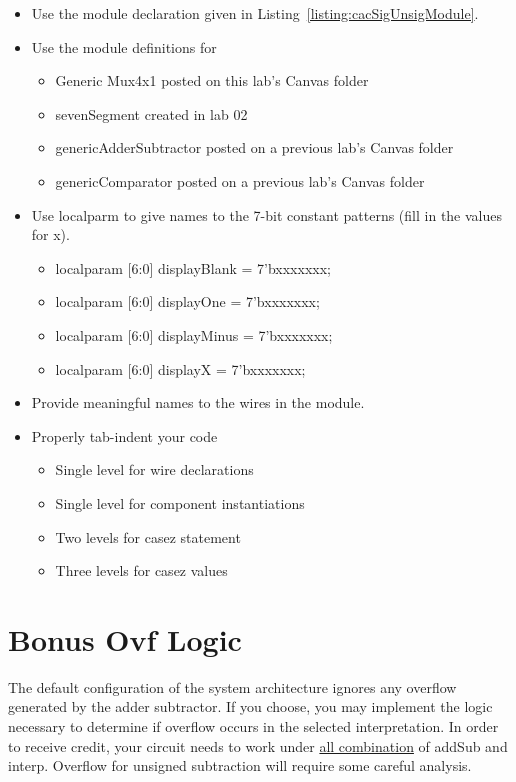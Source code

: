 \begin{itemize}
\item
  Use the module declaration given in Listing~\ref{listing:cacSigUnsigModule}.
\item
  Use the module definitions for

  \begin{itemize}
  \item
    Generic Mux4x1 posted on this lab's Canvas folder
  \item
    sevenSegment created in lab 02
  \item
    genericAdderSubtractor posted on a previous lab's Canvas folder
  \item
    genericComparator posted on a previous lab's Canvas folder
  \end{itemize}
\item
  Use localparm to give names to the 7-bit constant patterns (fill in
  the values for x).

  \begin{itemize}
  \item
    localparam {[}6:0{]} displayBlank = 7'bxxxxxxx;
  \item
    localparam {[}6:0{]} displayOne = 7'bxxxxxxx;
  \item
    localparam {[}6:0{]} displayMinus = 7'bxxxxxxx;
  \item
    localparam {[}6:0{]} displayX = 7'bxxxxxxx;
  \end{itemize}
\item
  Provide meaningful names to the wires in the module.
\item
  Properly tab-indent your code

  \begin{itemize}
  \item
    Single level for wire declarations
  \item
    Single level for component instantiations
  \item
    Two levels for casez statement
  \item
    Three levels for casez values
  \end{itemize}
\end{itemize}

\section{Bonus Ovf Logic}

The default configuration of the system architecture ignores any
overflow generated by the adder subtractor. If you choose, you may
implement the logic necessary to determine if overflow occurs in the
selected interpretation. In order to receive credit, your circuit needs
to work under \uline{all combination} of addSub and interp. Overflow for
unsigned subtraction will require some careful analysis.

